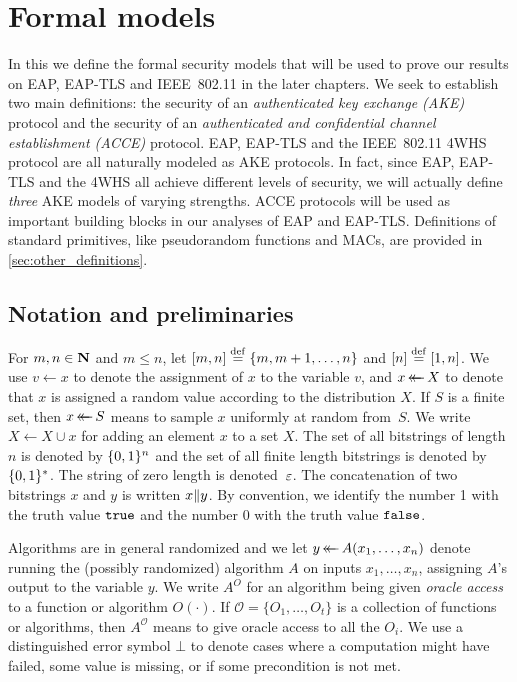 \chapter{Formal models}\label{sec:definitions}


\begingroup
\hypersetup{linkcolor=black}
\minitoc
\endgroup

\vspace{1ex}


In this  we define the formal security models that will be used to prove our results on EAP, EAP-TLS and IEEE~802.11 in the later chapters.
We seek to establish two main definitions:
the security of an \emph{authenticated key exchange (AKE)} protocol and the security of an \emph{authenticated and confidential channel establishment (ACCE)} protocol.
EAP, EAP-TLS and the IEEE~802.11 4WHS protocol are all naturally modeled as AKE  protocols.
In fact,
since EAP, EAP-TLS and the 4WHS all achieve different levels of security,
we will actually define \emph{three} AKE models of varying strengths.
ACCE protocols will be used as important building blocks in our analyses of EAP and EAP-TLS.
Definitions of standard primitives,
like pseudorandom functions and MACs,
are provided in \cref{sec:other_definitions}. 








\section{Notation and preliminaries}
For $m,n \in \mathbf{N}$ and $m \leq n$, 
let $[m,n] \overset{\mathrm{def}}{=} \lbrace m, m+1, \dotsc, n \rbrace$ and $[n] \overset{\mathrm{def}}{=} [1, n]$.
We use $v \gets x$ to denote the assignment of $x$ to the variable $v$,
and  $x \operatorname{\leftarrow\mathrel{\mkern-14mu}\leftarrow} X$ to denote that $x$ is assigned a random value according to the distribution $X$.
If $S$ is a finite set, then $x \operatorname{\leftarrow\mathrel{\mkern-14mu}\leftarrow} S$ means to sample $x$ uniformly at random from~$S$.
We write $X \gets X \cup x$ for adding an element $x$ to a set $X$.
The set of all bitstrings of length $n$ is denoted by $\lbrace 0, 1 \rbrace^n$
and the set of all finite length bitstrings is denoted by $\lbrace 0, 1 \rbrace^*$.
The string of zero length is denoted~$\varepsilon$.
The concatenation of two bitstrings $x$ and $y$ is written $x \| y$.
By convention, we identify the number 1 with the truth value $\mathtt{true}$ and
the number 0 with the truth value $\mathtt{false}$.

Algorithms are in general randomized and we let $y \operatorname{\leftarrow\mathrel{\mkern-14mu}\leftarrow} A(x_1, \dotsc, x_n)$ denote running the (possibly randomized) algorithm $A$ on inputs $x_1, \dotsc, x_n$,
assigning $A$'s output to the variable $y$.
We write $A^O$ for an algorithm being given \emph{oracle access} to a function or algorithm $O(\cdot)$.
If $\mathcal{O} = \lbrace O_1, \dotsc, O_t \rbrace$ is a collection of functions or algorithms,
then $A^{\mathcal{O}}$ means to give oracle access to all the $O_i$.
We use a distinguished error symbol $\bot$ to denote cases where a computation might have failed,
some value is missing, or if some precondition is not met.


